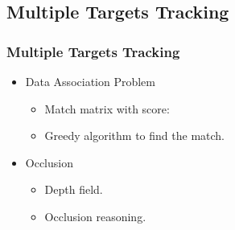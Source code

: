 \documentclass{beamer}
\begin{document}
\subsection{Multiple Targets Tracking}
\begin{frame}
	\frametitle{Multiple Targets Tracking}
	\begin{itemize}
		\item Data Association Problem
		\begin{itemize}
			\item Match matrix with score:

			\item Greedy algorithm to find the match.
		\end{itemize}
		\item Occlusion
		\begin{itemize}
			\item Depth field.
			\item Occlusion reasoning.		
		\end{itemize}
	\end{itemize}
\end{frame}
\end{document}
